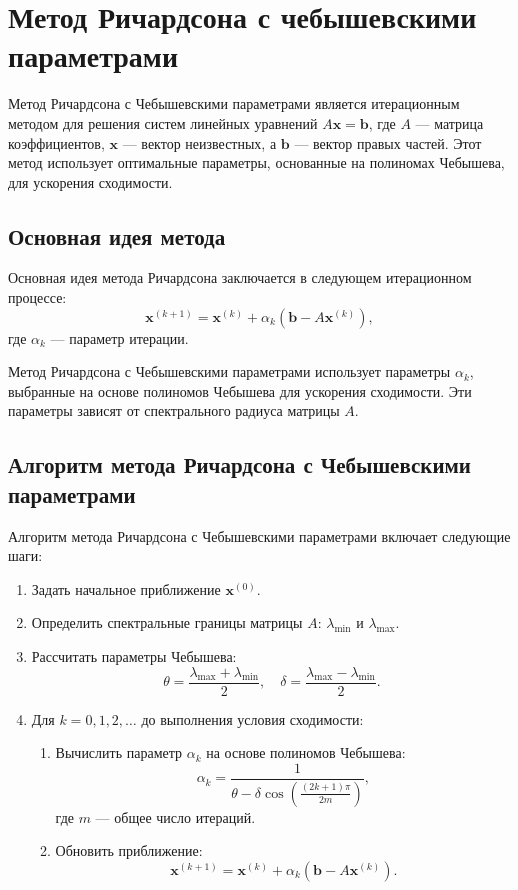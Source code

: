 \documentclass{article}
\begin{document}
\section{Метод Ричардсона с чебышевскими параметрами}
Метод Ричардсона с Чебышевскими параметрами является итерационным методом для решения систем линейных уравнений \(A\mathbf{x} = \mathbf{b}\), где \(A\) — матрица коэффициентов, \(\mathbf{x}\) — вектор неизвестных, а \(\mathbf{b}\) — вектор правых частей. Этот метод использует оптимальные параметры, основанные на полиномах Чебышева, для ускорения сходимости.

\subsection*{Основная идея метода}

Основная идея метода Ричардсона заключается в следующем итерационном процессе:
\[
\mathbf{x}^{(k+1)} = \mathbf{x}^{(k)} + \alpha_k (\mathbf{b} - A\mathbf{x}^{(k)}),
\]
где \(\alpha_k\) — параметр итерации.

Метод Ричардсона с Чебышевскими параметрами использует параметры \(\alpha_k\), выбранные на основе полиномов Чебышева для ускорения сходимости. Эти параметры зависят от спектрального радиуса матрицы \(A\).

\subsection*{Алгоритм метода Ричардсона с Чебышевскими параметрами}

Алгоритм метода Ричардсона с Чебышевскими параметрами включает следующие шаги:
\begin{enumerate}
    \item Задать начальное приближение \(\mathbf{x}^{(0)}\).
    \item Определить спектральные границы матрицы \(A\): \(\lambda_{\min}\) и \(\lambda_{\max}\).
    \item Рассчитать параметры Чебышева:
    \[
    \theta = \frac{\lambda_{\max} + \lambda_{\min}}{2}, \quad \delta = \frac{\lambda_{\max} - \lambda_{\min}}{2}.
    \]
    \item Для \(k = 0, 1, 2, \ldots\) до выполнения условия сходимости:
    \begin{enumerate}
        \item Вычислить параметр \(\alpha_k\) на основе полиномов Чебышева:
        \[
        \alpha_k = \frac{1}{\theta - \delta \cos\left(\frac{(2k+1)\pi}{2m}\right)},
        \]
        где \(m\) — общее число итераций.
        \item Обновить приближение:
        \[
        \mathbf{x}^{(k+1)} = \mathbf{x}^{(k)} + \alpha_k (\mathbf{b} - A\mathbf{x}^{(k)}).
        \]
    \end{enumerate}
\end{enumerate}
\end{document}
